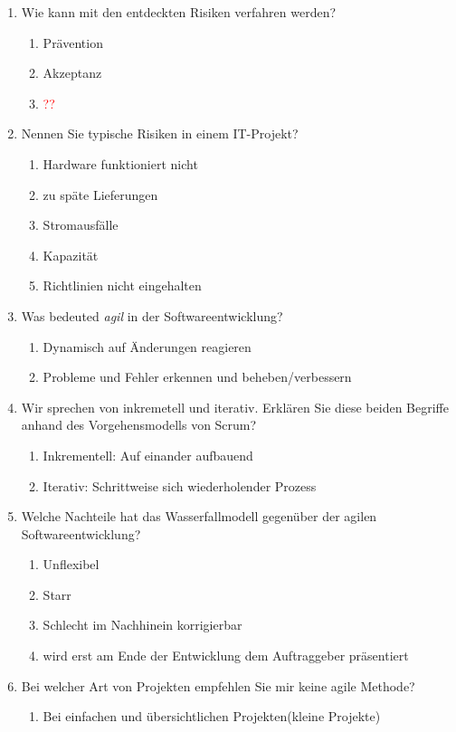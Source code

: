 \documentclass[12pt,a4paper]{article}
\begin{document}
\begin{enumerate}
	\item Wie kann mit den entdeckten Risiken verfahren werden?
	\begin{enumerate}
		\item Prävention
		\item Akzeptanz
		\item \textcolor{red}{??}
	\end{enumerate}
	\item Nennen Sie typische Risiken in einem IT-Projekt?
	\begin{enumerate}
		\item Hardware funktioniert nicht
		\item zu späte Lieferungen
		\item Stromausfälle
		\item Kapazität
		\item Richtlinien nicht eingehalten
	\end{enumerate}
	\item Was bedeuted \textit{agil} in der Softwareentwicklung?
	\begin{enumerate}
		\item Dynamisch auf Änderungen reagieren
		\item Probleme und Fehler erkennen und beheben/verbessern
	\end{enumerate}
	\item Wir sprechen von inkremetell und iterativ. Erklären Sie diese beiden Begriffe anhand des Vorgehensmodells von Scrum?
	\begin{enumerate}
		\item Inkrementell: Auf einander aufbauend
		\item Iterativ: Schrittweise sich wiederholender Prozess
	\end{enumerate}
	\item Welche Nachteile hat das Wasserfallmodell gegenüber der agilen Softwareentwicklung?
	\begin{enumerate}
		\item Unflexibel
		\item Starr 
		\item Schlecht im Nachhinein korrigierbar
		\item wird erst am Ende der Entwicklung dem Auftraggeber präsentiert
	\end{enumerate}
	\item Bei welcher Art von Projekten empfehlen Sie mir keine agile Methode?
	\begin{enumerate}
		\item Bei einfachen und übersichtlichen Projekten(kleine Projekte)

\end{enumerate}
\end{enumerate}
\end{document}
